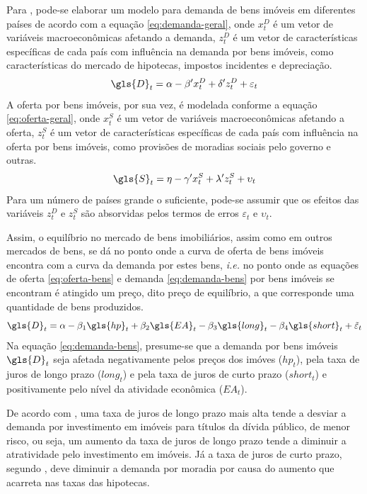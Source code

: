 \documentclass[
	12pt,				%
	oneside,			%
	a4paper,			%
	chapter=TITLE,		%
	section=TITLE,		%
	english,			%
	brazil				%
	]{abntex2}
\begin{document}
Para \textcite[p.~6]{ADAMS2010}, pode-se elaborar um modelo para demanda de bens imóveis
em diferentes países de acordo com a equação \eqref{eq:demanda-geral}, onde
\(x_t^D\) é um vetor de variáveis macroeconômicas afetando a demanda, \(z_t^D\) é
um vetor de características específicas de cada país com influência na demanda
por bens imóveis, como características do mercado de hipotecas, impostos
incidentes e depreciação.
\begin{equation}
\gls{D}_t = \alpha - \beta' x_t^D + \delta' z_t^D + \varepsilon_t
\label{eq:demanda-geral}
\end{equation}
A oferta por bens imóveis, por sua vez, é modelada conforme a equação
\eqref{eq:oferta-geral}, onde \(x_t^S\) é um vetor de variáveis macroeconômicas
afetando a oferta, \(z_t^S\) é um vetor de características específicas de cada
país com influência na oferta por bens imóveis, como provisões de moradias
sociais pelo governo e outras.
\begin{equation}
\gls{S}_t = \eta - \gamma' x_t^S + \lambda' z_t^S + \upsilon_t
\label{eq:oferta-geral}
\end{equation}
Para um número de países grande o suficiente, pode-se assumir que os efeitos das
variáveis \(z_t^D\) e \(z_t^S\) são absorvidas pelos termos de erros \(\varepsilon_t\)
e \(\upsilon_t\).

Assim, o equilíbrio no mercado de bens imobiliários, assim como em outros
mercados de bens, se dá no ponto onde a curva de oferta de bens imóveis encontra
com a curva da demanda por estes bens, \emph{i.e.} no ponto onde as equações de
oferta \eqref{eq:oferta-bens} e demanda \eqref{eq:demanda-bens} por bens
imóveis se encontram é atingido um preço, dito preço de equilíbrio, a que
corresponde uma quantidade de bens produzidos.
\begin{equation}
\gls{D}_t = \alpha - \beta_1 \gls{hp}_t + \beta_2 \gls{EA}_t - 
\beta_3 \gls{long}_t - \beta_4 \gls{short}_t + \tilde \varepsilon_t
\label{eq:demanda-bens}
\end{equation}
Na equação \eqref{eq:demanda-bens}, presume-se que a demanda por bens imóveis
\(\gls{D}_t\) seja afetada negativamente pelos preços dos imóves (\(hp_t\)), pela
taxa de juros de longo prazo (\(long_t\)) e pela taxa de juros de curto prazo
(\(short_t\)) e positivamente pelo nível da atividade econômica (\(EA_t\)).

De acordo com \textcite[p.~7-8]{ADAMS2010}, uma taxa de juros de longo prazo mais alta
tende a desviar a demanda por investimento em imóveis para títulos da dívida
público, de menor risco, ou seja, um aumento da taxa de juros de longo prazo
tende a diminuir a atratividade pelo investimento em imóveis. Já a taxa de juros
de curto prazo, segundo \textcite[p.~7]{ADAMS2010}, deve diminuir a demanda por moradia
por causa do aumento que acarreta nas taxas das hipotecas.
\end{document}

